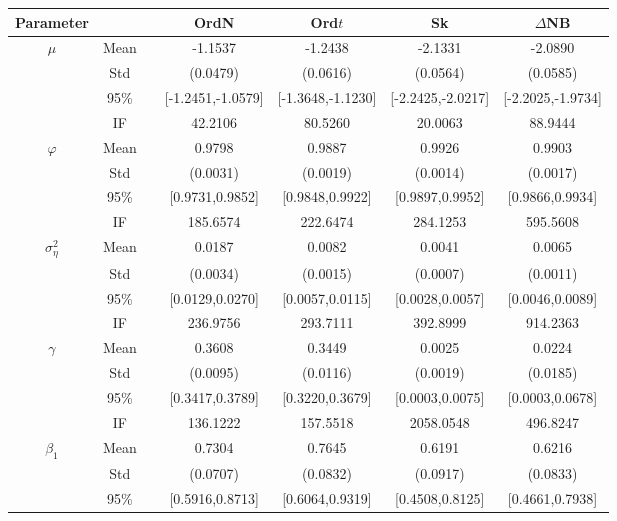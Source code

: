 \begin{table} 
\center 
\begin{footnotesize}
\tabcolsep=0.07cm
\begin{singlespace}
\begin{tabular}{ccc cccc } 
\toprule 
Parameter &&& OrdN  & Ord$t$ & Sk & $\Delta$NB \\ \hline
 $\mu$   & Mean   &  &  -1.1537  &  -1.2438  &  -2.1331  &  -2.0890  \\  
 & Std   &  &  (0.0479)  &  (0.0616)  &  (0.0564)  &  (0.0585)  \\  
 & 95\%  &  &  [-1.2451,-1.0579]  &  [-1.3648,-1.1230]  &  [-2.2425,-2.0217]  &  [-2.2025,-1.9734]  \\  
 & IF  &  &  42.2106  &  80.5260  &  20.0063  &  88.9444  \\ [1.0ex] 
 $\varphi$   & Mean   &  &  0.9798  &  0.9887  &  0.9926  &  0.9903  \\  
 & Std   &  &  (0.0031)  &  (0.0019)  &  (0.0014)  &  (0.0017)  \\  
 & 95\%  &  &  [0.9731,0.9852]  &  [0.9848,0.9922]  &  [0.9897,0.9952]  &  [0.9866,0.9934]  \\  
 & IF  &  &  185.6574  &  222.6474  &  284.1253  &  595.5608  \\ [1.0ex] 
 $\sigma^2_{\eta}$   & Mean   &  &  0.0187  &  0.0082  &  0.0041  &  0.0065  \\  
 & Std   &  &  (0.0034)  &  (0.0015)  &  (0.0007)  &  (0.0011)  \\  
 & 95\%  &  &  [0.0129,0.0270]  &  [0.0057,0.0115]  &  [0.0028,0.0057]  &  [0.0046,0.0089]  \\  
 & IF  &  &  236.9756  &  293.7111  &  392.8999  &  914.2363  \\ [1.0ex] 
 $\gamma$   & Mean   &  &  0.3608  &  0.3449  &  0.0025  &  0.0224  \\  
 & Std   &  &  (0.0095)  &  (0.0116)  &  (0.0019)  &  (0.0185)  \\  
 & 95\%  &  &  [0.3417,0.3789]  &  [0.3220,0.3679]  &  [0.0003,0.0075]  &  [0.0003,0.0678]  \\  
 & IF  &  &  136.1222  &  157.5518  &  2058.0548  &  496.8247  \\ [1.0ex] 
 $\beta_1$   & Mean   &  &  0.7304  &  0.7645  &  0.6191  &  0.6216  \\  
 & Std   &  &  (0.0707)  &  (0.0832)  &  (0.0917)  &  (0.0833)  \\  
 & 95\%  &  &  [0.5916,0.8713]  &  [0.6064,0.9319]  &  [0.4508,0.8125]  &  [0.4661,0.7938]  \\  

\end{tabular}
\end{singlespace}
\end{footnotesize}
\end{table}
